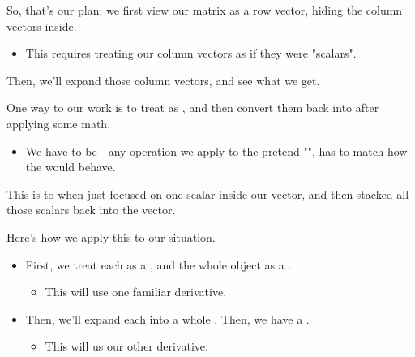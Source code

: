         So, that's our plan: we first view our matrix as a row vector, hiding the column vectors inside.

        \begin{itemize}
            \item This requires treating our column vectors as if they were "scalars".
        \end{itemize}

        Then, we'll expand those column vectors, and see what we get.\\

    

        \begin{concept}
            One way to  our work is to treat  as , and then convert them back into  after applying some math.

            \begin{itemize}
                \item We have to be  - any operation we apply to the pretend "", has to match how the  would behave.
            \end{itemize}
            
            \subsecdiv
            
            This is  to when just focused on one scalar inside our vector, and then stacked all those scalars back into the vector.
        \end{concept}

        Here's how we apply this to our situation.
        
        \begin{itemize}
            \item First, we treat each  as a , and the whole object as a .

            \begin{itemize}
                \item This will use one familiar derivative.
            \end{itemize}

            \item Then, we'll expand each  into a whole . Then, we have a .
            
            \begin{itemize}
                \item This will us our other derivative.\\
            \end{itemize}
        \end{itemize} 
        

